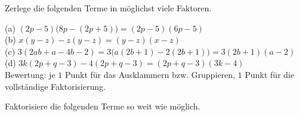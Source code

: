 \documentclass[11pt]{exam}
\begin{document}
\begin{questions}
\noaddpoints
\question[\totalpoints] %
\addpoints
Zerlege die folgenden Terme in möglichst viele Faktoren.
{\begin{solution}
	(a) $(2p-5)\bigl(8p-(2p+5)\bigr)=(2p-5)(6p-5)$\\
	(b) $x(y-z)-z(y-z)=(y-z)(x-z)$\\
	(c) $3(2ab+a-4b-2)=3\bigl(a(2b+1)-2(2b+1)\bigr)=3(2b+1)(a-2)$\\
	(d) $3k(2p+q-3)-4(2p+q-3)=(2p+q-3)(3k-4)$\\
	Bewertung: je $1$ Punkt für das Ausklammern bzw. Gruppieren, $1$ Punkt für die vollständige Faktorisierung.
\end{solution}}
{}

\noaddpoints
\question[\totalpoints]
\addpoints
Faktorisiere die folgenden Terme so weit wie möglich.
\end{questions}
\end{document}
